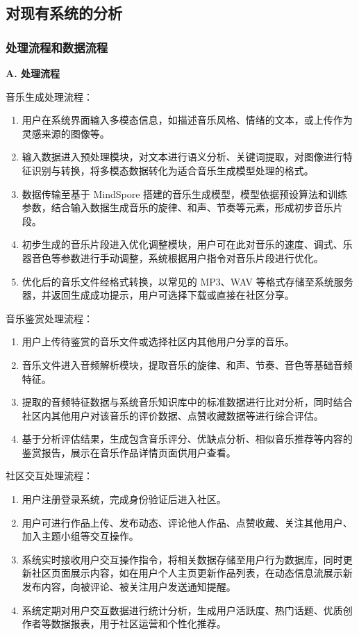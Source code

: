 \documentclass{base}
\numberwithin{figure}{section} %
\begin{document}
\subsection{对现有系统的分析}

\subsubsection{处理流程和数据流程}

\textbf{A. 处理流程}

音乐生成处理流程：

\begin{enumerate}
    \item 用户在系统界面输入多模态信息，如描述音乐风格、情绪的文本，或上传作为灵感来源的图像等。
    \item 输入数据进入预处理模块，对文本进行语义分析、关键词提取，对图像进行特征识别与转换，将多模态数据转化为适合音乐生成模型处理的格式。​
    \item 数据传输至基于 MindSpore 搭建的音乐生成模型，模型依据预设算法和训练参数，结合输入数据生成音乐的旋律、和声、节奏等元素，形成初步音乐片段。​
    \item 初步生成的音乐片段进入优化调整模块，用户可在此对音乐的速度、调式、乐器音色等参数进行手动调整，系统根据用户指令对音乐片段进行优化。​
    \item 优化后的音乐文件经格式转换，以常见的 MP3、WAV 等格式存储至系统服务器，并返回生成成功提示，用户可选择下载或直接在社区分享。
\end{enumerate}

音乐鉴赏处理流程：

\begin{enumerate}
    \item 用户上传待鉴赏的音乐文件或选择社区内其他用户分享的音乐。​
    \item 音乐文件进入音频解析模块，提取音乐的旋律、和声、节奏、音色等基础音频特征。
    \item 提取的音频特征数据与系统音乐知识库中的标准数据进行比对分析，同时结合社区内其他用户对该音乐的评价数据、点赞收藏数据等进行综合评估。​
    \item 基于分析评估结果，生成包含音乐评分、优缺点分析、相似音乐推荐等内容的鉴赏报告，展示在音乐作品详情页面供用户查看。
\end{enumerate}

社区交互处理流程：​

\begin{enumerate}
    \item 用户注册登录系统，完成身份验证后进入社区。​
    \item 用户可进行作品上传、发布动态、评论他人作品、点赞收藏、关注其他用户、加入主题小组等交互操作。​
    \item 系统实时接收用户交互操作指令，将相关数据存储至用户行为数据库，同时更新社区页面展示内容，如在用户个人主页更新作品列表，在动态信息流展示新发布内容，向被评论、被关注用户发送通知提醒。​
    \item 系统定期对用户交互数据进行统计分析，生成用户活跃度、热门话题、优质创作者等数据报表，用于社区运营和个性化推荐。
\end{enumerate}
\end{document}
